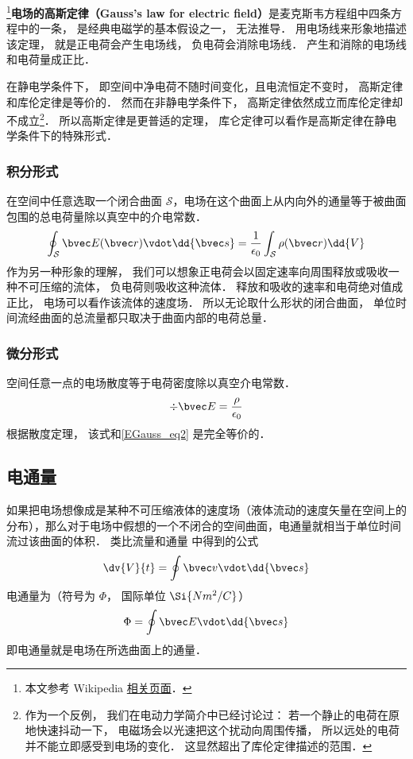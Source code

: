 

\footnote{本文参考 Wikipedia \href{https://en.wikipedia.org/wiki/Gauss's_law}{相关页面}．}\textbf{电场的高斯定律（Gauss's law for electric field）}是麦克斯韦方程组中四条方程中的一条， 是经典电磁学的基本假设之一， 无法推导． 用电场线来形象地描述该定理， 就是正电荷会产生电场线， 负电荷会消除电场线． 产生和消除的电场线和电荷量成正比．

在静电学条件下， 即空间中净电荷不随时间变化，且电流恒定不变时， 高斯定律和库伦定律是等价的． 然而在非静电学条件下， 高斯定律依然成立而库伦定律却不成立\footnote{作为一个反例， 我们在电动力学简介中已经讨论过： 若一个静止的电荷在原地快速抖动一下， 电磁场会以光速把这个扰动向周围传播， 所以远处的电荷并不能立即感受到电场的变化． 这显然超出了库伦定律描述的范围．}． 所以高斯定律是更普适的定理， 库仑定律可以看作是高斯定律在静电学条件下的特殊形式．

\subsubsection{积分形式}
在空间中任意选取一个闭合曲面 $\mathcal S$，电场在这个曲面上从内向外的通量等于被曲面包围的总电荷量除以真空中的介电常数．
\begin{equation}\label{EGauss_eq2}
\oint_{\mathcal S} \bvec E(\bvec r) \vdot \dd{\bvec s} = \frac{1}{\epsilon_0} \int_{\mathcal S} \rho(\bvec r) \dd{V}
\end{equation}
作为另一种形象的理解， 我们可以想象正电荷会以固定速率向周围释放或吸收一种不可压缩的流体， 负电荷则吸收这种流体． 释放和吸收的速率和电荷绝对值成正比， 电场可以看作该流体的速度场． 所以无论取什么形状的闭合曲面， 单位时间流经曲面的总流量都只取决于曲面内部的电荷总量．

\subsubsection{微分形式}
空间任意一点的电场散度等于电荷密度除以真空介电常数．
\begin{equation}\label{EGauss_eq1}
\div \bvec E = \frac{\rho}{\epsilon_0}
\end{equation}
根据散度定理， 该式和\autoref{EGauss_eq2} 是完全等价的．

\subsection{电通量}
如果把电场想像成是某种不可压缩液体的速度场（液体流动的速度矢量在空间上的分布），那么对于电场中假想的一个不闭合的空间曲面，电通量就相当于单位时间流过该曲面的体积．
类比流量和通量%
中得到的公式
\begin{equation}
\dv{V}{t} = \oint \bvec v \vdot \dd{\bvec s}
\end{equation} 
电通量为（符号为 $\Phi $， 国际单位 $\Si{N m^2/C}$）
\begin{equation}
\Phi  = \oint \bvec E \vdot \dd{\bvec s}
\end{equation} 
即电通量就是电场在所选曲面上的通量．

